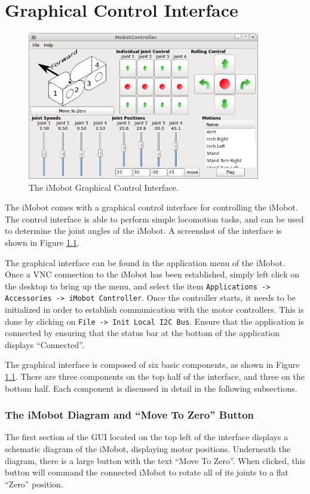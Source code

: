 \documentclass[11pt]{report}
\begin{document}
\chapter{Graphical Control Interface}
\begin{figure}
\begin{center}
\includegraphics[width=4in]{gui_screenshot.png}
\caption{\label{fig:gui}The iMobot Graphical Control Interface.}
\end{center}
\end{figure}
The iMobot comes with a graphical control interface for controlling the iMobot.
The control interface is able to perform simple locomotion tasks, and can be
used to determine the joint angles of the iMobot. A screenshot of the interface
is shown in Figure \ref{fig:gui}.

The graphical interface can be found in the application menu of the iMobot. Once
a VNC connection to the iMobot has been established, simply left click on the
desktop to bring up the menu, and select the item \texttt{Applications ->
Accessories -> iMobot Controller}. Once the controller starts, it needs to be
initialized in order to establish communication with the motor controllers.
This is done by clicking on \texttt{File -> Init Local I2C Bus}. Ensure that 
the application is connected by ensuring that the status bar at the bottom of the
application displays ``Connected''. 

The graphical interface is composed of six basic components, as shown in
Figure \ref{fig:gui}. There are three components on the top half of the
interface, and three on the bottom half. Each component is discussed in
detail in the following subsections.

\subsection{The iMobot Diagram and ``Move To Zero'' Button}
The first section of the GUI located on the top left of the interface
displays a schematic diagram of the iMobot, displaying motor positions.
Underneath the diagram, there is a large button with the text 
``Move To Zero''. When clicked, this button will command the connected
iMobot to rotate all of its joints to a flat ``Zero'' position.
\end{document}
